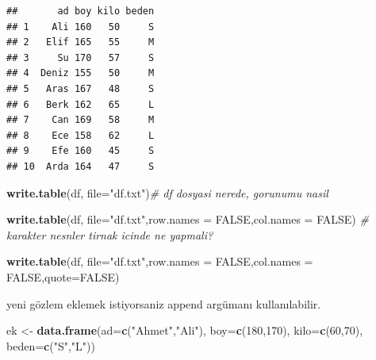 \documentclass[
  oneside]{book}
\newenvironment{Shaded}{\begin{snugshade}}{\end{snugshade}}
\newcommand{\AttributeTok}[1]{\textcolor[rgb]{0.13,0.29,0.53}{#1}}
\newcommand{\CommentTok}[1]{\textcolor[rgb]{0.56,0.35,0.01}{\textit{#1}}}
\newcommand{\ConstantTok}[1]{\textcolor[rgb]{0.56,0.35,0.01}{#1}}
\newcommand{\DecValTok}[1]{\textcolor[rgb]{0.00,0.00,0.81}{#1}}
\newcommand{\FunctionTok}[1]{\textcolor[rgb]{0.13,0.29,0.53}{\textbf{#1}}}
\newcommand{\NormalTok}[1]{#1}
\newcommand{\OtherTok}[1]{\textcolor[rgb]{0.56,0.35,0.01}{#1}}
\newcommand{\StringTok}[1]{\textcolor[rgb]{0.31,0.60,0.02}{#1}}
\begin{document}
\begin{verbatim}
##       ad boy kilo beden
## 1    Ali 160   50     S
## 2   Elif 165   55     M
## 3     Su 170   57     S
## 4  Deniz 155   50     M
## 5   Aras 167   48     S
## 6   Berk 162   65     L
## 7    Can 169   58     M
## 8    Ece 158   62     L
## 9    Efe 160   45     S
## 10  Arda 164   47     S
\end{verbatim}

\begin{Shaded}
\begin{Highlighting}[]
\FunctionTok{write.table}\NormalTok{(df, }\AttributeTok{file=}\StringTok{"df.txt"}\NormalTok{)}\CommentTok{\# df dosyasi nerede, gorunumu nasil}
\end{Highlighting}
\end{Shaded}

\begin{Shaded}
\begin{Highlighting}[]
\FunctionTok{write.table}\NormalTok{(df, }\AttributeTok{file=}\StringTok{"df.txt"}\NormalTok{,}\AttributeTok{row.names =} \ConstantTok{FALSE}\NormalTok{,}\AttributeTok{col.names =} \ConstantTok{FALSE}\NormalTok{)}
\CommentTok{\# karakter nesnler tirnak icinde ne yapmali?}
\end{Highlighting}
\end{Shaded}

\begin{Shaded}
\begin{Highlighting}[]
\FunctionTok{write.table}\NormalTok{(df, }\AttributeTok{file=}\StringTok{"df.txt"}\NormalTok{,}\AttributeTok{row.names =} \ConstantTok{FALSE}\NormalTok{,}\AttributeTok{col.names =} \ConstantTok{FALSE}\NormalTok{,}\AttributeTok{quote=}\ConstantTok{FALSE}\NormalTok{)}
\end{Highlighting}
\end{Shaded}

yeni gözlem eklemek istiyorsaniz append argümanı kullanılabilir.

\begin{Shaded}
\begin{Highlighting}[]
\NormalTok{ ek }\OtherTok{\textless{}{-}} \FunctionTok{data.frame}\NormalTok{(}\AttributeTok{ad=}\FunctionTok{c}\NormalTok{(}\StringTok{"Ahmet"}\NormalTok{,}\StringTok{"Ali"}\NormalTok{), }\AttributeTok{boy=}\FunctionTok{c}\NormalTok{(}\DecValTok{180}\NormalTok{,}\DecValTok{170}\NormalTok{), }\AttributeTok{kilo=}\FunctionTok{c}\NormalTok{(}\DecValTok{60}\NormalTok{,}\DecValTok{70}\NormalTok{), }
                 \AttributeTok{beden=}\FunctionTok{c}\NormalTok{(}\StringTok{"S"}\NormalTok{,}\StringTok{"L"}\NormalTok{))}
\end{Highlighting}
\end{Shaded}
\end{document}
